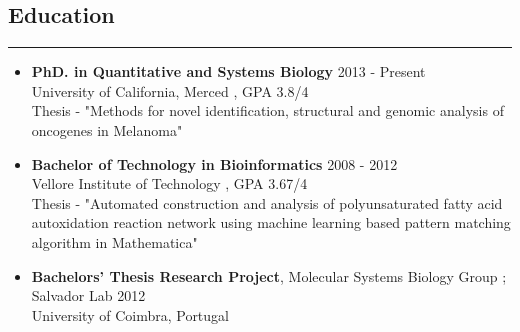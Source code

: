 \documentclass[line,margin]{resume_type2}
\begin{document}
\address{  your@email \\ (123) 456-7890 }
\address{ \href {http://rgupta.in}   {www.rgupta.in} \\  \href {http://github.com/rg-code} {github.com/rg-code}}

\begin{resume}

\section{Education}\hskip 4pt {\hfill \color{gray} \rule{14.7 cm}{0.1 pt}}
\begin{itemize}
                    \vskip 3pt
                    \item[]
                    {\textbf{PhD. in Quantitative and Systems Biology}}{\color{gray} \hfill 2013 - Present}\\
                    {University of California, Merced} {, GPA 3.8/4}\\
                    {\small{ Thesis} - "Methods for novel identification, structural and genomic analysis of oncogenes in  Melanoma"}
                    \vskip 5pt
                    \item[]
                    {\textbf{Bachelor of Technology in Bioinformatics }} {\color{gray} \hfill 2008 - 2012}\\
                    Vellore Institute of Technology , GPA 3.67/4 \\
                    {\small{ Thesis} - "Automated construction and analysis of polyunsaturated fatty acid autoxidation reaction network using machine learning based pattern matching algorithm in Mathematica"}
                    \item[]
                    \vskip 5pt
                    {\textbf{Bachelors' Thesis Research Project}}, { Molecular Systems Biology Group ; Salvador Lab}{\color{gray} \hfill 2012} \\
                    University of Coimbra, Portugal
		            
\end{itemize}
		            \vskip 10pt
		            

\end{resume}
\end{document}
